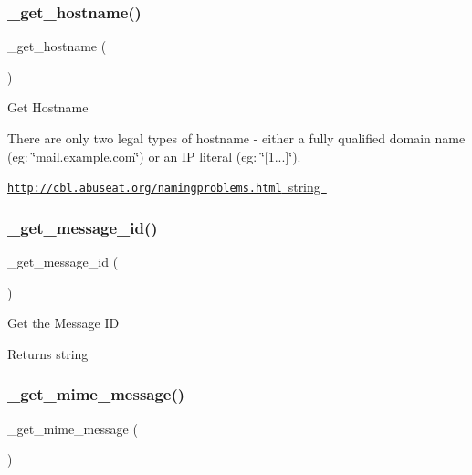 \subsubsection{\texorpdfstring{\+\_\+get\+\_\+hostname()}{\_get\_hostname()}}
{\footnotesize\ttfamily \+\_\+get\+\_\+hostname (\begin{DoxyParamCaption}{ }\end{DoxyParamCaption})\hspace{0.3cm}{\ttfamily [protected]}}

Get Hostname

There are only two legal types of hostname -\/ either a fully qualified domain name (eg\+: \char`\"{}mail.\+example.\+com\char`\"{}) or an IP literal (eg\+: \char`\"{}\mbox{[}1...\mbox{]}\char`\"{}).

\mbox{\hyperlink{}{\href{http://cbl.abuseat.org/namingproblems.html}{\tt http\+://cbl.\+abuseat.\+org/namingproblems.\+html}  string }}\mbox{\label{class_c_i___email_a253c34263736465755f85ec4192aa6b4}} 
\subsubsection{\texorpdfstring{\+\_\+get\+\_\+message\+\_\+id()}{\_get\_message\_id()}}
{\footnotesize\ttfamily \+\_\+get\+\_\+message\+\_\+id (\begin{DoxyParamCaption}{ }\end{DoxyParamCaption})\hspace{0.3cm}{\ttfamily [protected]}}

Get the Message ID

\begin{DoxyReturn}{Returns}
string 
\end{DoxyReturn}
\mbox{\label{class_c_i___email_a2211ba669bd8d076041d4e72bc8a9c59}} 
\subsubsection{\texorpdfstring{\+\_\+get\+\_\+mime\+\_\+message()}{\_get\_mime\_message()}}
{\footnotesize\ttfamily \+\_\+get\+\_\+mime\+\_\+message (\begin{DoxyParamCaption}{ }\end{DoxyParamCaption})\hspace{0.3cm}{\ttfamily [protected]}}


